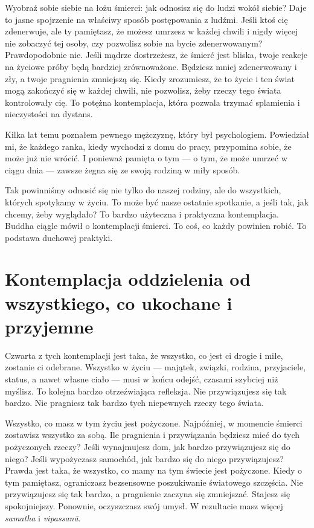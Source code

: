 \documentclass[12pt,openany]{book}
\begin{document}
Wyobraź sobie siebie na łożu śmierci: jak odnosisz się do ludzi wokół siebie? Daje to jasne spojrzenie na właściwy sposób postępowania z ludźmi. Jeśli ktoś cię zdenerwuje, ale ty pamiętasz, że możesz umrzesz w każdej chwili i nigdy więcej nie zobaczyć tej osoby, czy pozwolisz sobie na bycie zdenerwowanym? Prawdopodobnie nie. Jeśli mądrze dostrzeżesz, że śmierć jest bliska, twoje reakcje na życiowe próby będą bardziej zrównoważone. Będziesz mniej zdenerwowany i zły, a twoje pragnienia zmniejszą się. Kiedy zrozumiesz, że to życie i ten świat mogą zakończyć się w każdej chwili, nie pozwolisz, żeby rzeczy tego świata kontrolowały cię. To potężna kontemplacja, która pozwala trzymać splamienia i nieczystości na dystans.

Kilka lat temu poznałem pewnego mężczyznę, który był psychologiem. Powiedział mi, że każdego ranka, kiedy wychodzi z domu do pracy, przypomina sobie, że może już nie wrócić. I ponieważ pamięta o tym --- o tym, że może umrzeć w ciągu dnia --- zawsze żegna się ze swoją rodziną w miły sposób.

Tak powinniśmy odnosić się nie tylko do naszej rodziny, ale do wszystkich, których spotykamy w życiu. To może być nasze ostatnie spotkanie, a jeśli tak, jak chcemy, żeby wyglądało? To bardzo użyteczna i praktyczna kontemplacja. Buddha ciągle mówił o kontemplacji śmierci. To coś, co każdy powinien robić. To podstawa duchowej praktyki.

\section*{Kontemplacja oddzielenia od wszystkiego, co ukochane i przyjemne}

Czwarta z tych kontemplacji jest taka, że wszystko, co jest ci drogie i miłe, zostanie ci odebrane. Wszystko w życiu --- majątek, związki, rodzina, przyjaciele, status, a nawet własne ciało --- musi w końcu odejść, czasami szybciej niż myślisz. To kolejna bardzo otrzeźwiająca refleksja. Nie przywiązujesz się tak bardzo. Nie \linebreak pragniesz tak bardzo tych niepewnych rzeczy tego świata.

Wszystko, co masz w tym życiu jest pożyczone. Najpóźniej, w momencie śmierci zostawisz wszystko za sobą. Ile pragnienia i przywiązania będziesz mieć do tych pożyczonych rzeczy? Jeśli wynajmujesz dom, jak bardzo przywiązujesz się do niego? Jeśli wypożyczasz samochód, jak bardzo się do niego przywiązujesz? Prawda jest taka, że wszystko, co mamy na tym świecie jest pożyczone. Kiedy o tym pamiętasz, ograniczasz bezsensowne poszukiwanie światowego szczęścia. Nie przywiązujesz się tak bardzo, a pragnienie zaczyna się zmniejszać. Stajesz się spokojniejszy. Ponownie, oczyszczasz swój umysł. W rezultacie masz więcej \textit{samatha} i \textit{vipassanā}.
\end{document}
